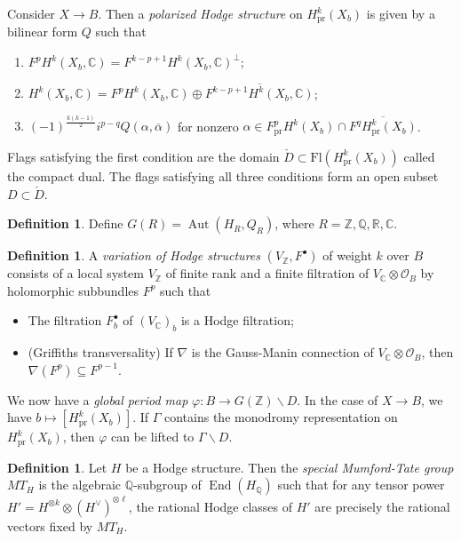 \documentclass[leqno, openany]{memoir}
\theoremstyle{definition}
\newtheorem{defn}[thm]{Definition}
\theoremstyle{remark}
\theoremstyle{plain}
\theoremstyle{definition}
\theoremstyle{remark}
\newcommand{\R}{\mathbb{R}}
\newcommand{\C}{\mathbb{C}}
\newcommand{\Z}{\mathbb{Z}}
\newcommand{\Q}{\mathbb{Q}}
\newcommand{\mc}[1]{\mathcal{#1}}
\newcommand{\mr}[1]{\mathrm{#1}}
\newcommand{\ol}[1]{\overline{#1}}
\DeclareMathOperator{\End}{End}
\DeclareMathOperator{\Aut}{Aut}
\begin{document}
Consider $X \to B$. Then a \textit{polarized Hodge structure} on $H^k_{\mr{pr}}(X_b)$ is given by a bilinear form $Q$ such that
\begin{enumerate}
    \item $F^p H^k(X_b, \C) = F^{k-p+1} H^k(X_b, \C)^{\perp}$;
    \item $H^k(X_b, \C) = F^p H^k(X_b, \C) \oplus \ol{F^{k-p+1} H^k(X_b, \C)}$;
    \item $(-1)^{\frac{k(k-1)}{2}} i^{p-q} Q(\alpha, \ol{\alpha})$ for nonzero $\alpha \in F^p_{\mr{pr}} H^k(X_b) \cap \ol{F^q H^k_{\mr{pr}}(X_b)}$.
\end{enumerate}
Flags satisfying the first condition are the domain $\check{D} \subset \mr{Fl}(H^k_{\mr{pr}}(X_b))$ called the compact dual. The flags satisfying all three conditions form an open subset $D \subset \check{D}$.

\begin{defn}
    Define $G(R) = \Aut(H_R, Q_R)$, where $R = \Z, \Q, \R, \C$.
\end{defn}

\begin{defn}
    A \textit{variation of Hodge structures} $(V_{\Z}, F^{\bullet})$ of weight $k$ over $B$ consists of a local system $V_{\Z}$ of finite rank and a finite filtration of $V_{\C} \otimes \mc{O}_B$ by holomorphic subbundles $F^p$ such that
    \begin{itemize}
        \item The filtration $F_b^{\bullet}$ of $(V_{\C})_b$ is a Hodge filtration;
        \item (Griffiths transversality) If $\nabla$ is the Gauss-Manin connection of $V_{\C} \otimes \mc{O}_B$, then $\nabla(F^p) \subseteq F^{p-1}$.
    \end{itemize}
\end{defn}

We now have a \textit{global period map} $\varphi \colon B \to G(\Z) \backslash D$. In the case of $X \to B$, we have $b \mapsto [H^k_{\mr{pr}}(X_b)]$. If $\Gamma$ contains the monodromy representation on $H^k_{\mr{pr}}(X_b)$, then $\varphi$ can be lifted to $\Gamma \backslash D$.

\begin{defn}
    Let $H$ be a Hodge structure. Then the \textit{special Mumford-Tate group} $MT_H$ is the algebraic $\Q$-subgroup of $\End(H_{\Q})$ such that for any tensor power $H' = H^{\otimes k} \otimes (H^{\vee})^{\otimes \ell}$, the rational Hodge classes of $H'$ are precisely the rational vectors fixed by $MT_H$.
\end{defn}
\end{document}

